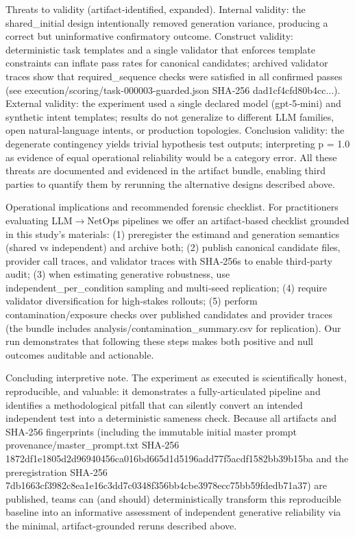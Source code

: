 \documentclass[conference]{IEEEtran}
\begin{document}
Threats to validity (artifact‑identified, expanded). Internal validity: the shared\_initial design intentionally removed generation variance, producing a correct but uninformative confirmatory outcome. Construct validity: deterministic task templates and a single validator that enforces template constraints can inflate pass rates for canonical candidates; archived validator traces show that required\_sequence checks were satisfied in all confirmed passes (see execution/scoring/task-000003-guarded.json SHA‑256 dad1cf4cfd80b4cc...). External validity: the experiment used a single declared model (gpt‑5‑mini) and synthetic intent templates; results do not generalize to different LLM families, open natural‑language intents, or production topologies. Conclusion validity: the degenerate contingency yields trivial hypothesis test outputs; interpreting p = 1.0 as evidence of equal operational reliability would be a category error. All these threats are documented and evidenced in the artifact bundle, enabling third parties to quantify them by rerunning the alternative designs described above.

Operational implications and recommended forensic checklist. For practitioners evaluating LLM\ensuremath{\rightarrow}NetOps pipelines we offer an artifact‑based checklist grounded in this study's materials: (1) preregister the estimand and generation semantics (shared vs independent) and archive both; (2) publish canonical candidate files, provider call traces, and validator traces with SHA‑256s to enable third‑party audit; (3) when estimating generative robustness, use independent\_per\_condition sampling and multi‑seed replication; (4) require validator diversification for high‑stakes rollouts; (5) perform contamination/exposure checks over published candidates and provider traces (the bundle includes analysis/contamination\_summary.csv for replication). Our run demonstrates that following these steps makes both positive and null outcomes auditable and actionable.

Concluding interpretive note. The experiment as executed is scientifically honest, reproducible, and valuable: it demonstrates a fully‑articulated pipeline and identifies a methodological pitfall that can silently convert an intended independent test into a deterministic sameness check. Because all artifacts and SHA‑256 fingerprints (including the immutable initial master prompt provenance/master\_prompt.txt SHA‑256 1872df1e1805d2d96940456ca016bd665d1d5196add77f5acdf1582bb39b15ba and the preregistration SHA‑256 7db1663cf3982c8ea1e16c3dd7c0348f356bb4cbe3978ecc75bb59fdedb71a37) are published, teams can (and should) deterministically transform this reproducible baseline into an informative assessment of independent generative reliability via the minimal, artifact‑grounded reruns described above.
\end{document}
